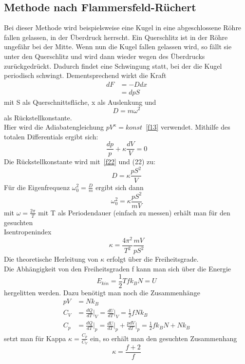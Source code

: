 \documentclass[11pt,a4paper]{article}
\begin{document}
\subsection{Methode nach Flammersfeld-Rüchert}
Bei dieser Methode wird beispielsweise eine Kugel in eine abgeschlossene Röhre fallen gelassen, in der Überdruck herrscht. Ein Querschlitz ist in der Röhre ungefähr bei der Mitte. Wenn nun die Kugel fallen gelassen wird, so fällt sie unter den Querschlitz und wird dann wieder wegen des Überdrucks zurückgedrückt. Dadurch findet eine Schwingung statt, bei der die Kugel periodisch schwingt. Dementsprechend wirkt die Kraft
\begin{align}
    \label{f20}
  dF&=-Ddx \\
  &=dpS
\end{align}
mit S als Querschnittsfläche, x als Auslenkung und 
\begin{equation}
    \label{f21}
D=m\omega^2
\end{equation}
 als Rückstellkonstante. \\
Hier wird die Adiabatengleichung $pV^\kappa=konst$~\eqref{f13} verwendet. Mithilfe des totalen Differentials ergibt sich:
\begin{equation}
    \label{f22}
  \frac{dp}{p}+\kappa\frac{dV}{V}=0
\end{equation}
Die Rückstellkonstante wird mit~\eqref{f22} und (22) zu:
\begin{equation}
    \label{f23}
  D=\kappa\frac{pS^2}{V}
\end{equation}
Für die Eigenfrequenz $\omega_{0}^2=\frac{D}{m}$ ergibt sich dann
\begin{equation}
    \label{f24}
  \omega_{0}^2=\kappa\frac{pS^2}{mV}
\end{equation}
mit $\omega=\frac{2\pi}{T}$ mit T als Periodendauer (einfach zu messen) erhält man für den gesuchten \\ Isentropenindex
\begin{equation}
    \label{f25}
  \kappa=\frac{4\pi^2}{T^2}\frac{mV}{pS^2}
\end{equation}
Die theoretische Herleitung von $\kappa$ erfolgt über die Freiheitsgrade. \\ Die Abhängigkeit von den Freiheitsgraden f kann man sich über die Energie
\begin{equation}
  E_{kin}=\frac{1}{2}T f k_{B} N = U
\end{equation}
hergelitten werden. Dazu benötigt man noch die Zusammenhänge
\begin{align}
  pV &= N k_{B} \\
  C_{V} &= \frac{dQ}{dT}\bigg|_{V}=\frac{dU}{dT}\bigg|_{V}=\frac{1}{2}fNk_{B} \\
  C_{p}&=\frac{dQ}{dT}\bigg|_{p} = \frac{dU}{dT}\bigg|_{p} +\frac{pdV}{dT}\bigg|_{p}=\frac{1}{2}fk_{B}N+Nk_{B}
\end{align}
setzt man für Kappa $\kappa=\frac{C_{p}}{C_{V}}$ ein, so erhält man den gesuchten Zusammenhang
\begin{equation}
  \kappa = \frac{f+2}{f}
\end{equation}
  \newpage
\end{document}
